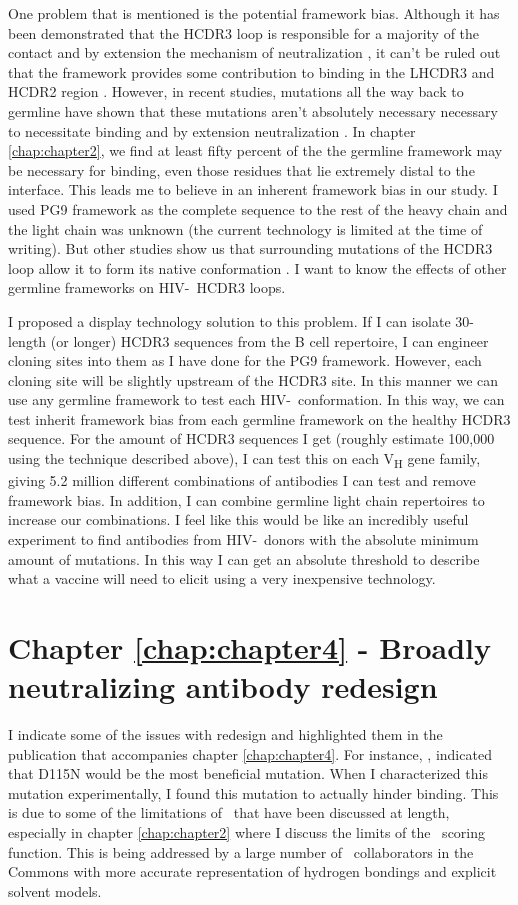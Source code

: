 One problem that is mentioned is the potential framework bias. Although it has been demonstrated that the HCDR3 loop is responsible for a majority of the contact and by extension the mechanism of neutralization \citep{Pejchal:2010fp,Pancera:2010hh}, it can't be ruled out that the framework provides some contribution to binding in the LHCDR3 and HCDR2 region \citep{McLellan:2011dg}. However, in recent studies, mutations all the way back to germline have shown that these mutations aren't absolutely necessary necessary to necessitate binding and by extension neutralization \citep{Klein:2013iz}. In chapter \ref{chap:chapter2}, we find at least fifty percent of the the germline framework may be necessary for binding, even those residues that lie extremely distal to the interface. This leads me to believe in an inherent framework bias in our study. I used PG9 framework as the complete sequence to the rest of the heavy chain and the light chain was unknown (the current technology is limited at the time of writing). But other studies show us that surrounding mutations of the HCDR3 loop allow it to form its native conformation \citep{Wong:2011ff}. I want to know the effects of other germline frameworks on HIV-\naive~HCDR3 loops.

I proposed a display technology solution to this problem. If I can isolate 30-length (or longer) HCDR3 sequences from the B cell repertoire, I can engineer cloning sites into them as I have done for the PG9 framework. However, each cloning site will be slightly upstream of the HCDR3 site. In this manner we can use any germline framework to test each HIV-\naive~conformation. In this way, we can test inherit framework bias from each germline framework on the healthy HCDR3 sequence. For the amount of HCDR3 sequences I get (roughly estimate 100,000 using the technique described above), I can test this on each V\textsubscript{H} gene family, giving 5.2 million different combinations of antibodies I can test and remove framework bias. In addition, I can combine germline light chain repertoires to increase our combinations. I feel like this would be like an incredibly useful experiment to find antibodies from HIV-\naive~donors with the absolute minimum amount of mutations. In this way I can get an absolute threshold to describe what a vaccine will need to elicit using a very inexpensive technology.

\section{Chapter \ref{chap:chapter4} - Broadly neutralizing antibody redesign}
I indicate some of the issues with redesign and highlighted them in the publication that accompanies chapter \ref{chap:chapter4}. For instance, \rosettadesign, indicated that D115N would be the most beneficial mutation. When I characterized this mutation experimentally, I found this mutation to actually hinder binding. This is due to some of the limitations of \rosetta~that have been discussed at length, especially in chapter \ref{chap:chapter2} where I discuss the limits of the \rosetta~scoring function. This is being addressed by a large number of \rosetta~collaborators in the Commons with more accurate representation of hydrogen bondings and explicit solvent models.

